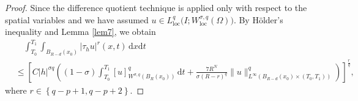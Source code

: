 \documentclass[reqno,10pt]{amsart}
\numberwithin{equation}{section}
\begin{document}
\begin{proof}
	Since the difference quotient technique is applied only with respect to the spatial variables and we have assumed $u\in L^q_{\mathrm{loc}}\bigl( I;W^{\sigma,q}_{\mathrm{loc}}(\Omega)\bigl)$. By H\"{o}lder's inequality and Lemma \ref{lem7}, we obtain
	\begin{align}
		\label{6.0}
		&\quad\int_{T_0}^{T_1}\int_{B_{R-d}(x_0)}|\tau_hu|^r(x,t)\,\mathrm{d}x\mathrm{d}t\nonumber\\
		&\le \left[C|h|^{\sigma q}\left((1-\sigma)\int_{T_0}^{T_1}[u]^q_{W^{\sigma,q}(B_R(x_0))}\,\mathrm{d}t+\frac{7R^N}{\sigma(R-r)^q}\|u\|^q_{L^\infty\left( B_{R-d}(x_0)\times(T_0,T_1)\right) }\right)\right]^\frac{r}{q}, 
	\end{align}
	where $r\in\left\lbrace q-p+1,q-p+2\right\rbrace $.
	

\end{proof}
\end{document}
